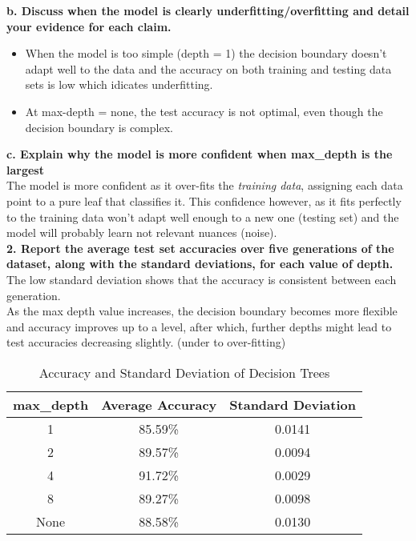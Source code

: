 \documentclass[acmconf,nonacm=true]{acmart}
\begin{document}
  \textbf{b. Discuss when the model is clearly underfitting/overfitting and detail your evidence for each claim.}
    \begin{itemize}
        \item When the model is too simple (depth = 1) the decision boundary doesn't adapt well to the data and the accuracy on both training and testing data sets is low which idicates underfitting.
    \item At max-depth = none, the test accuracy is not optimal, even though the decision boundary is complex.
    \end{itemize}
\textbf{c. Explain why the model is more confident when max\_depth is the largest} \\
    The model is more confident as it over-fits the \textit{training data}, assigning each data point to a pure leaf that classifies it. This confidence however, as it fits perfectly to the training data won't adapt well enough to a new one (testing set) and the model will probably learn not relevant nuances (noise).  
\\
    \textbf{2. Report the average test set accuracies over five generations of the dataset,
    along with the standard deviations, for each value of depth.}\\
The low standard deviation shows that the accuracy is consistent between each generation.\\
As the max depth value increases, the decision boundary becomes more flexible and accuracy improves up to a level, after which, further depths might lead to test accuracies decreasing slightly. (under to over-fitting)\\

\begin{table}[H]
    \centering
    \caption{Accuracy and Standard Deviation of Decision Trees}
    \begin{tabular}{|c|c|c|}
    \hline
     max\_depth & Average Accuracy & Standard Deviation \\
    \hline
    1 & 85.59\%&  0.0141\\
    2 & 89.57\%&  0.0094\\
    4 & 91.72\%&  0.0029\\
    8 & 89.27\%&  0.0098\\
    None & 88.58\%&  0.0130\\
    \hline
    \end{tabular}
\end{table}
\end{document}
